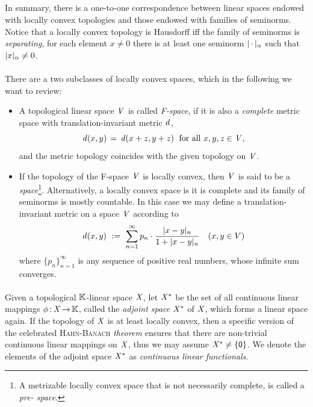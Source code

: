 \documentclass[11pt,twoside]{article}
\begin{document}
\subparagraph*{}
In summary,
there is a one-to-one correspondence
between linear spaces endowed with locally convex topologies
and those endowed with families of seminorms.
Notice that a locally convex topology is Hausdorff
iff
the family of seminorms is \textit{separating},
{\ie} for each element $x \neq 0$
there is at least one seminorm $\abs{\,\cdot\,} _{\alpha}$
such that $\abs{x} _{\alpha} \neq 0$.

\paragraph*{} %
There are a two subclasses of locally convex spaces,
which in the following we want to review:

\begin{itemize}[leftmargin=15pt]
\item[1.]
A topological linear space $\mathit{V}$ is called \textit{F-space},
if it is also a \textit{complete} metric space with translation-invariant
metric $\mathit{d}$,
{\ie}
\[
\mathit{d}(x,y) \,=\, \mathit{d}(x+z,y+z) \; \mbox{ for all } x,y,z \in \mathit{V},
\]
and the metric topology coincides with the given topology on $\mathit{V}$.

\item[2.]
If the topology of the F-space $\mathit{V}$ is locally convex,
then $\mathit{V}$ is said to be a \textit{{\FRECHET} space}\footnote{
A metrizable locally convex space that is not necessarily complete,
is called a \textit{pre-{\FRECHET} space}.}.
Alternatively,
a locally convex space is {\FRECHET}
\iff
it is complete and its family of seminorms is mostly countable.
In this case
we may define a translation-invariant metric on a {\FRECHET} space $\mathit{V}$
according to
\[
\d(x,y) \, \eqdef \,
\sum_{n=1}^{\infty} p_n \cdot \frac{\abs{x-y} _n}{1+ \abs{x-y} _n}
\quad (x,y \in \topV)
\]
where $\{p_n\}_{n=1}^{\infty}$ is any sequence of positive real numbers,
whose infinite sum converges.
\end{itemize}

\paragraph*{} %
Given a topological ${\mathbb{K}}$-linear space $\mathit{X}$,
let $\mathit{X}^*$ be the set of all continuous linear mappings
$\phi{\,:\,}\mathit{X} {\,\to\,} {\mathbb{K}}$,
called the \textit{adjoint space} $\mathit{X}^*$ of $\mathit{X}$,
which forms a linear space again.
If the topology of $\mathit{X}$ is at least locally convex,
then a specific version of the celebrated \textsc{Hahn-Banach} \textit{theorem}
ensures that
there are non-trivial continuous linear mappings on $\mathit{X}$,
thus we may assume $\mathit{X}^* \neq \{{\mathsf{0}}\}$.
We denote the elements of the adjoint space $\mathit{X}^*$ as
\textit{continuous linear functionals}.
\end{document}
